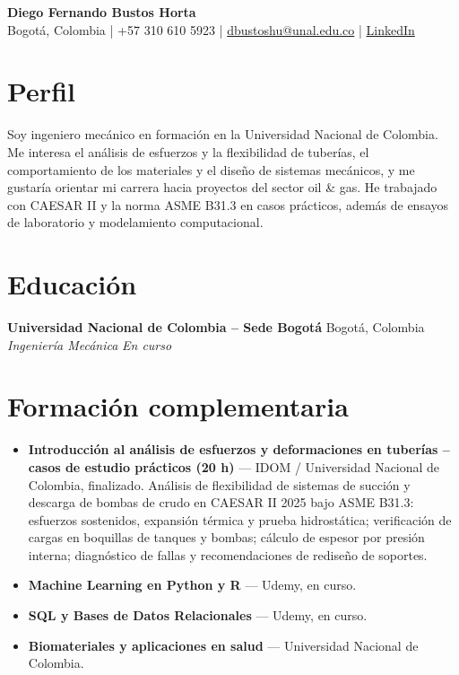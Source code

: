 \documentclass[9pt,letterpaper]{article}
\newcommand{\resumeSubheading}[4]{\textbf{#1} \hfill #2\\[-1pt]\textit{#3} \hfill \textit{#4}\\[-1pt]}
\begin{document}
\begin{center}
{\Large\bfseries Diego Fernando Bustos Horta}\\[3pt]
Bogotá, Colombia \;|\; +57 310 610 5923 \;|\; \href{mailto:dbustoshu@unal.edu.co}{dbustoshu@unal.edu.co} \;|\; \href{https://www.linkedin.com/in/diegobstos/}{LinkedIn}
\end{center}
\section{Perfil}
Soy ingeniero mecánico en formación en la Universidad Nacional de Colombia. Me interesa el análisis de esfuerzos y la flexibilidad de tuberías, el comportamiento de los materiales y el diseño de sistemas mecánicos, y me gustaría orientar mi carrera hacia proyectos del sector oil \& gas. He trabajado con CAESAR II y la norma ASME B31.3 en casos prácticos, además de ensayos de laboratorio y modelamiento computacional.
\section{Educación}
\resumeSubheading{Universidad Nacional de Colombia -- Sede Bogotá}{Bogotá, Colombia}{Ingeniería Mecánica}{En curso}
\section{Formación complementaria}
\begin{itemize}
\item \textbf{Introducción al análisis de esfuerzos y deformaciones en tuberías -- casos de estudio prácticos (20 h)} --- IDOM / Universidad Nacional de Colombia, finalizado. Análisis de flexibilidad de sistemas de succión y descarga de bombas de crudo en CAESAR II 2025 bajo ASME B31.3: esfuerzos sostenidos, expansión térmica y prueba hidrostática; verificación de cargas en boquillas de tanques y bombas; cálculo de espesor por presión interna; diagnóstico de fallas y recomendaciones de rediseño de soportes.
\item \textbf{Machine Learning en Python y R} --- Udemy, en curso.
\item \textbf{SQL y Bases de Datos Relacionales} --- Udemy, en curso.
\item \textbf{Biomateriales y aplicaciones en salud} --- Universidad Nacional de Colombia.
\end{itemize}
\end{document}
